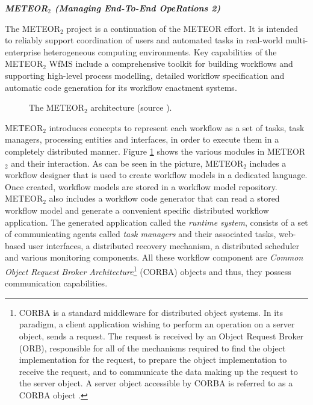 \label{chap1:sec:fully-distributed-wfms}
\noindent\textbf{\textit{METEOR$_2$ (Managing End-To-End OpeRations 2) \cite{das1997orbwork, meteor}}}

The METEOR$_2$ project is a continuation of the METEOR \cite{krishnakumar1995managing} effort. It is intended to reliably support coordination of users and automated tasks in real-world multi-enterprise heterogeneous computing environments. Key capabilities of the METEOR$_2$ WfMS include a comprehensive toolkit for building workflows and supporting high-level process modelling, detailed workflow specification and automatic code generation for its workflow enactment systems. 
\begin{figure}[ht!]
	\noindent
	\caption{The METEOR$_2$ architecture (source \cite{das1997orbwork}).}
	\label{chap1:fig:meteor2}
\end{figure}

METEOR$_2$ introduces concepts to represent each workflow as a set of tasks, task managers, processing entities and interfaces, in order to execute them in a completely distributed manner. Figure \ref{chap1:fig:meteor2} shows the various modules in METEOR$_2$ and their interaction. As can be seen in the picture, METEOR$_2$ includes a workflow designer that is used to create workflow models in a dedicated language. Once created, workflow models are stored in a workflow model repository. METEOR$_2$ also includes a workflow code generator that can read a stored workflow model and generate a convenient specific distributed workflow application. The generated application called the \textit{runtime system}, consists of a set of communicating agents called \textit{task managers} and their associated tasks, web-based user interfaces, a distributed recovery mechanism, a distributed scheduler and various monitoring components. All these workflow component are \textit{Common Object Request Broker Architecture}\footnote{CORBA is a standard middleware for distributed object systems. In its paradigm, a client application wishing to perform an operation on a server object, sends a request. The request is received by an Object Request Broker (ORB), responsible for all of the mechanisms required to find the object implementation for the request, to prepare the object implementation to receive the request, and to communicate the data making up the request to the server object. A server object accessible by CORBA is referred to as a CORBA object \cite{houlding2004system}.} (CORBA) objects and thus, they possess communication capabilities.

